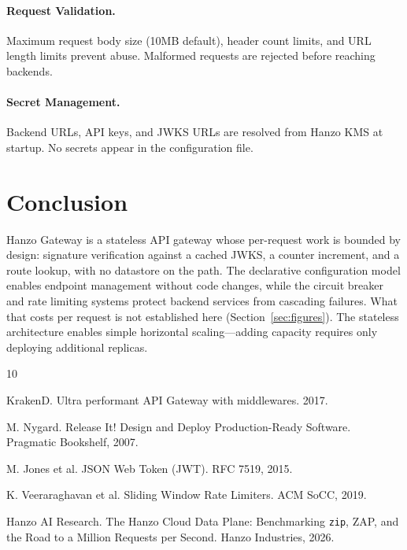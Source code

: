 \documentclass[11pt,twocolumn]{article}
\begin{document}
\paragraph{Request Validation.} Maximum request body size (10MB default), header count limits, and URL length limits prevent abuse. Malformed requests are rejected before reaching backends.

\paragraph{Secret Management.} Backend URLs, API keys, and JWKS URLs are resolved from Hanzo KMS at startup. No secrets appear in the configuration file.

\section{Conclusion}

Hanzo Gateway is a stateless API gateway whose per-request work is bounded by design: signature verification against a cached JWKS, a counter increment, and a route lookup, with no datastore on the path. The declarative configuration model enables endpoint management without code changes, while the circuit breaker and rate limiting systems protect backend services from cascading failures. What that costs per request is not established here (Section~\ref{sec:figures}). The stateless architecture enables simple horizontal scaling---adding capacity requires only deploying additional replicas.


\begin{thebibliography}{10}

KrakenD. Ultra performant API Gateway with middlewares. 2017.

M. Nygard. Release It! Design and Deploy Production-Ready Software. Pragmatic Bookshelf, 2007.

M. Jones et al. JSON Web Token (JWT). RFC 7519, 2015.

K. Veeraraghavan et al. Sliding Window Rate Limiters. ACM SoCC, 2019.

Hanzo AI Research. The Hanzo Cloud Data Plane: Benchmarking \texttt{zip}, ZAP, and the Road to a Million Requests per Second. Hanzo Industries, 2026.

\end{thebibliography}
\end{document}
